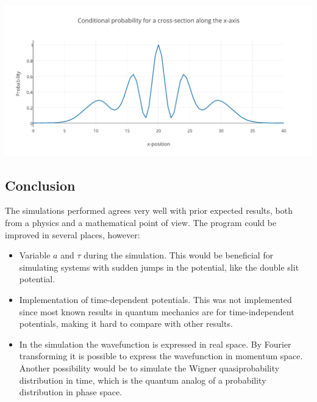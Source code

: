 \begin{Figure}
    \centerfloat
    \includegraphics[trim = 3.5mm 0mm 3.5mm 0mm, clip,scale = 0.435]{crosssectiondoubleslit.pdf}
    \label{fig:crosssection}
\end{Figure}


\subsection*{Conclusion}
The simulations performed agrees very well with prior expected results, both from a physics and a mathematical point of view. The program could be improved in several places, however:

\begin{itemize}
\item Variable $a$ and $\tau$ during the simulation. This would be beneficial for simulating systems with sudden jumps in the potential, like the double slit potential.
\item Implementation of time-dependent potentials. This was not implemented since most known results in quantum mechanics are for time-independent potentials, making it hard to compare with other results.
\item In the simulation the wavefunction is expressed in real space. By Fourier transforming it is possible to express the wavefunction in momentum space. Another possibility would be to simulate the Wigner quasiprobability distribution in time, which is the quantum analog of a probability distribution in phase space.
\end{itemize}

